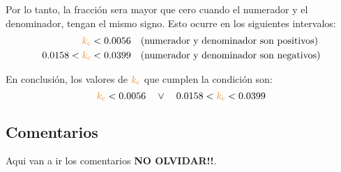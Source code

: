 Por lo tanto, la fracción sera mayor que cero cuando el numerador y el denominador,
tengan el mismo signo. Esto ocurre en los siguientes intervalos:
\begin{align}
  \nara{k_c} &< 0.0056 \quad \text{(numerador y denominador son positivos)} \\
  0.0158 < \nara{k_c} &< 0.0399 \quad \text{(numerador y denominador son negativos)}
\end{align}

En conclusión, los valores de $\nara{k_c}$ que cumplen la condición son:
\begin{equation}
  \nara{k_c} < 0.0056 \quad \lor \quad 0.0158 < \nara{k_c} < 0.0399
\end{equation}


\subsection{Comentarios}

Aqui van a ir los comentarios \textbf{NO OLVIDAR!!}.
